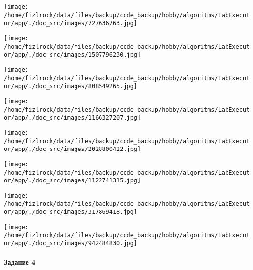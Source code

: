 \documentclass[a4paper, 12pt]{article}
\begin{document}
\texttt{[image: /home/fizlrock/data/files/backup/code\_backup/hobby/algoritms/LabExecutor/app/./doc\_src/images/727636763.jpg]}

\texttt{[image: /home/fizlrock/data/files/backup/code\_backup/hobby/algoritms/LabExecutor/app/./doc\_src/images/1507796230.jpg]}

\texttt{[image: /home/fizlrock/data/files/backup/code\_backup/hobby/algoritms/LabExecutor/app/./doc\_src/images/808549265.jpg]}

\texttt{[image: /home/fizlrock/data/files/backup/code\_backup/hobby/algoritms/LabExecutor/app/./doc\_src/images/1166327207.jpg]}

\texttt{[image: /home/fizlrock/data/files/backup/code\_backup/hobby/algoritms/LabExecutor/app/./doc\_src/images/2028800422.jpg]}

\texttt{[image: /home/fizlrock/data/files/backup/code\_backup/hobby/algoritms/LabExecutor/app/./doc\_src/images/1122741315.jpg]}

\texttt{[image: /home/fizlrock/data/files/backup/code\_backup/hobby/algoritms/LabExecutor/app/./doc\_src/images/317869418.jpg]}

\texttt{[image: /home/fizlrock/data/files/backup/code\_backup/hobby/algoritms/LabExecutor/app/./doc\_src/images/942484830.jpg]}
\pagebreak
\paragraph{Задание 4}
\end{document}
